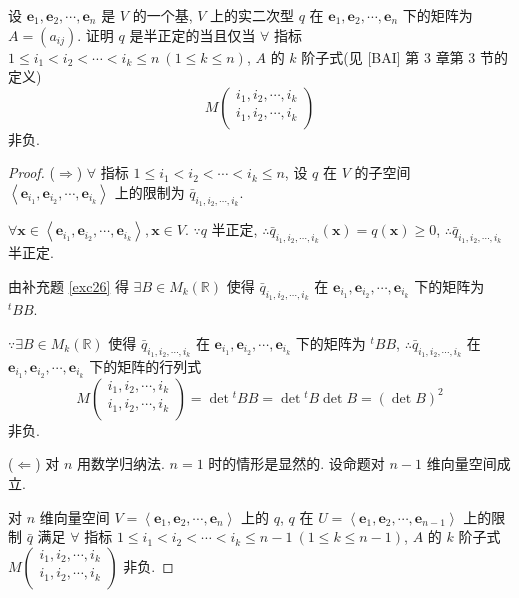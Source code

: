 \documentclass[color=black,device=normal,lang=cn,mode=geye]{elegantnote}
\begin{document}
\begin{exercisec}[1.7.6]\label{exc1.7.6}
    设 $\boldsymbol{e}_1,\boldsymbol{e}_2,\cdots,\boldsymbol{e}_n$ 是 $V$ 的一个基, $V$ 上的实二次型 $q$ 在 $\boldsymbol{e}_1,\boldsymbol{e}_2,\cdots,\boldsymbol{e}_n$ 下的矩阵为 $A=(a_{ij})$. 证明 $q$ 是半正定的当且仅当 $\forall$ 指标 $1\leq i_1<i_2<\cdots<i_k\leq n\ (1\leq k\leq n)$, $A$ 的 $k$ 阶子式(见 [BAI] 第 3 章第 3 节的定义)
    \[M\begin{pmatrix}
        i_1,i_2,\cdots,i_k \\
        i_1,i_2,\cdots,i_k \\
    \end{pmatrix}\]
    非负.
\end{exercisec}
\begin{proof}
    ($\Rightarrow$) $\forall$ 指标 $1\leq i_1<i_2<\cdots<i_k\leq n$, 设 $q$ 在 $V$ 的子空间 $\left<\boldsymbol{e}_{i_1},\boldsymbol{e}_{i_2},\cdots,\boldsymbol{e}_{i_k}\right>$ 上的限制为 $\bar{q}_{i_1,i_2,\cdots,i_k}$.

    $\forall\boldsymbol{x}\in\left<\boldsymbol{e}_{i_1},\boldsymbol{e}_{i_2},\cdots,\boldsymbol{e}_{i_k}\right>,\boldsymbol{x}\in V$. $\because q$ 半正定, $\therefore\bar{q}_{i_1,i_2,\cdots,i_k}(\boldsymbol{x})=q(\boldsymbol{x})\geq0$, $\therefore\bar{q}_{i_1,i_2,\cdots,i_k}$ 半正定.
    
    由补充题 \ref{exc26} 得 $\exists B\in M_k(\mathbb{R})$ 使得 $\bar{q}_{i_1,i_2,\cdots,i_k}$ 在 $\boldsymbol{e}_{i_1},\boldsymbol{e}_{i_2},\cdots,\boldsymbol{e}_{i_k}$ 下的矩阵为 ${}^tBB$.

    $\because\exists B\in M_k(\mathbb{R})$ 使得 $\bar{q}_{i_1,i_2,\cdots,i_k}$ 在 $\boldsymbol{e}_{i_1},\boldsymbol{e}_{i_2},\cdots,\boldsymbol{e}_{i_k}$ 下的矩阵为 ${}^tBB$, $\therefore\bar{q}_{i_1,i_2,\cdots,i_k}$ 在 $\boldsymbol{e}_{i_1},\boldsymbol{e}_{i_2},\cdots,\boldsymbol{e}_{i_k}$ 下的矩阵的行列式
    \[M\begin{pmatrix}
        i_1,i_2,\cdots,i_k \\
        i_1,i_2,\cdots,i_k \\
    \end{pmatrix}=\det{}^tBB=\det{}^tB\det B=(\det B)^2\]
    非负.

    ($\Leftarrow$) 对 $n$ 用数学归纳法. $n=1$ 时的情形是显然的. 设命题对 $n-1$ 维向量空间成立.
    
    对 $n$ 维向量空间 $V=\left<\boldsymbol{e}_1,\boldsymbol{e}_2,\cdots,\boldsymbol{e}_n\right>$ 上的 $q$, $q$ 在 $U=\left<\boldsymbol{e}_1,\boldsymbol{e}_2,\cdots,\boldsymbol{e}_{n-1}\right>$ 上的限制 $\bar{q}$ 满足 $\forall$ 指标 $1\leq i_1<i_2<\cdots<i_k\leq n-1\ (1\leq k\leq n-1)$, $A$ 的 $k$ 阶子式
    $M\begin{pmatrix}
        i_1,i_2,\cdots,i_k \\
        i_1,i_2,\cdots,i_k \\
    \end{pmatrix}$
    非负.


\end{proof}
\end{document}

